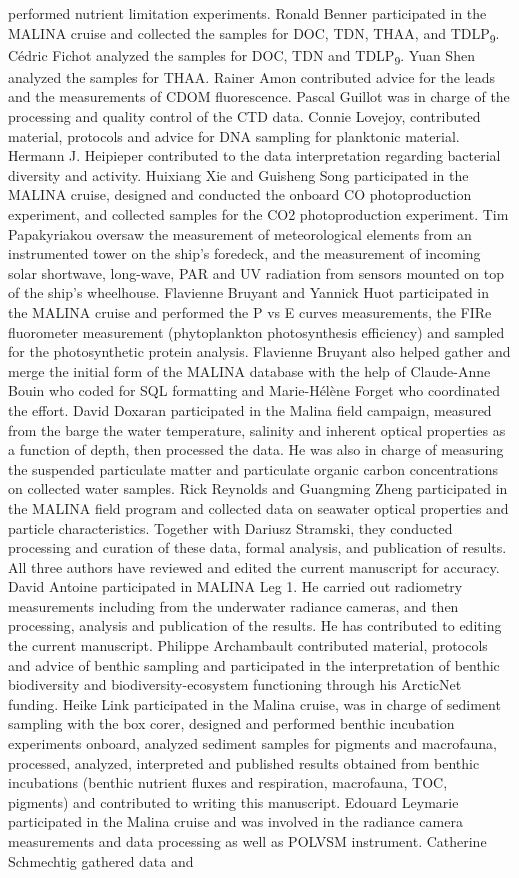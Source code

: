 \documentclass[essd, manuscript]{copernicus}
\begin{document}
{performed nutrient limitation experiments. Ronald Benner participated in the MALINA cruise and collected the samples for DOC, TDN, THAA, and TDLP\textsubscript{9}. Cédric Fichot analyzed the samples for DOC, TDN and TDLP\textsubscript{9}. Yuan Shen analyzed the samples for THAA. Rainer Amon contributed advice for the leads and the measurements of CDOM fluorescence. Pascal Guillot was in charge of the processing and quality control of the CTD data. Connie Lovejoy, contributed material, protocols and advice for DNA sampling for planktonic material. Hermann J. Heipieper contributed to the data interpretation regarding bacterial diversity and activity. Huixiang Xie and Guisheng Song participated in the MALINA cruise, designed and conducted the onboard CO photoproduction experiment, and collected samples for the CO2 photoproduction experiment. Tim Papakyriakou oversaw the measurement of meteorological elements from an instrumented tower on the ship’s foredeck, and the measurement of incoming solar shortwave, long-wave, PAR and UV radiation from sensors mounted on top of the ship’s wheelhouse. Flavienne Bruyant and Yannick Huot participated in the MALINA cruise and performed the P vs E curves measurements, the FIRe fluorometer measurement (phytoplankton photosynthesis efficiency) and sampled for the photosynthetic protein analysis. Flavienne Bruyant also helped gather and merge the initial form of the MALINA database with the help of Claude-Anne Bouin who coded for SQL formatting and Marie-Hélène Forget who coordinated the effort. David Doxaran participated in the Malina field campaign, measured from the barge the water temperature, salinity and inherent optical properties as a function of depth, then processed the data. He was also in charge of measuring the suspended particulate matter and particulate organic carbon concentrations on collected water samples. Rick Reynolds and Guangming Zheng participated in the MALINA field program and collected data on seawater optical properties and particle characteristics. Together with Dariusz Stramski, they conducted processing and curation of these data, formal analysis, and publication of results. All three authors have reviewed and edited the current manuscript for accuracy. David Antoine participated in MALINA Leg 1. He carried out radiometry measurements including from the underwater radiance cameras, and then processing, analysis and publication of the results. He has contributed to editing the current manuscript. Philippe Archambault contributed material, protocols and advice of benthic sampling and participated in the interpretation of benthic biodiversity and biodiversity-ecosystem functioning through his ArcticNet funding. Heike Link participated in the Malina cruise, was in charge of sediment sampling with the box corer, designed and performed benthic incubation experiments onboard, analyzed sediment samples for pigments and macrofauna, processed, analyzed, interpreted and published results obtained from benthic incubations (benthic nutrient fluxes and respiration, macrofauna, TOC, pigments) and contributed to writing this manuscript. Edouard Leymarie participated in the Malina cruise and was involved in the radiance camera measurements and data processing as well as POLVSM instrument. Catherine Schmechtig gathered data and }
\end{document}
